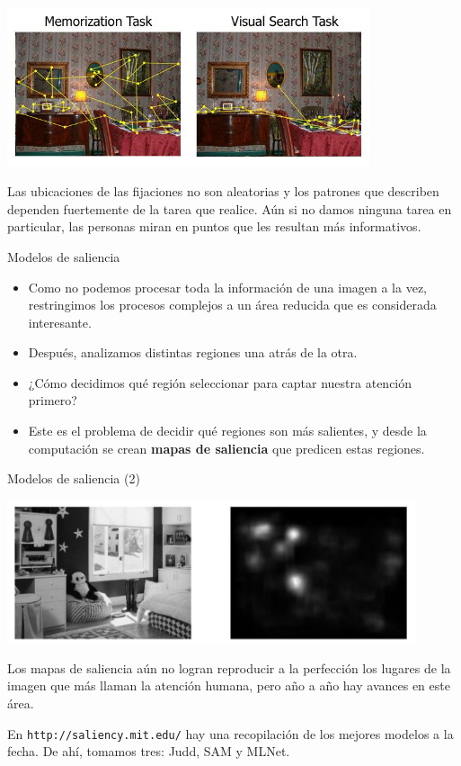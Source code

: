 \documentclass[compress]{beamer}
\begin{document}
\begin{frame}
\begin{center}
\includegraphics[width=0.8\textwidth]{images/castelhano-fixations.jpg}
\end{center}

Las ubicaciones de las fijaciones no son aleatorias y los patrones que describen dependen fuertemente de la tarea que realice. Aún si no damos ninguna tarea en particular, las personas miran en puntos que les resultan más informativos.
\end{frame}

\begin{frame}{Modelos de saliencia}

\begin{itemize}
\item Como no podemos procesar toda la información de una imagen a la vez, restringimos los procesos complejos a un área reducida que es considerada interesante. 
\item Después, analizamos distintas regiones una atrás de la otra. 
\item ¿Cómo decidimos qué región seleccionar para captar nuestra atención primero?
\item Este es el problema de decidir qué regiones son más salientes, y desde la computación se crean \textbf{mapas de saliencia} que predicen estas regiones.
\end{itemize}

\end{frame}

\begin{frame}{Modelos de saliencia (2)}
\begin{center}
\includegraphics[width=0.9\textwidth]{images/ejemplo-mlnet.png}
\end{center}

{\small Los mapas de saliencia aún no logran reproducir a la perfección los lugares de la imagen que más llaman la atención humana, pero año a año hay avances en este área.\\}

\bigskip

{\small En \texttt{http://saliency.mit.edu/} hay una recopilación de los mejores modelos a la fecha. De ahí, tomamos tres: Judd, SAM y MLNet.}

\end{frame}
\end{document}
